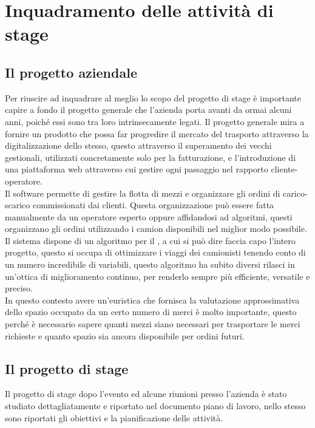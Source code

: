 
\hypertarget{(chap:capitolo3)}{}
\chapter{Inquadramento delle attività di stage}
\section{Il progetto aziendale}
Per riuscire ad inquadrare al meglio lo scopo del progetto di stage è importante capire a fondo il progetto generale che l'azienda porta avanti da ormai alcuni anni, poiché essi sono tra loro intrinsecamente legati. Il progetto generale mira a fornire un prodotto che possa far progredire il mercato del trasporto attraverso la digitalizzazione dello stesso, questo attraverso il superamento dei vecchi gestionali, utilizzati concretamente solo per la fatturazione, e l'introduzione di una piattaforma web attraverso cui gestire ogni passaggio nel rapporto cliente-operatore.\\
Il software permette di gestire la flotta di mezzi e organizzare gli ordini di carico-scarico commissionati dai clienti. Questa organizzazione può essere fatta manualmente da un operatore esperto oppure affidandosi ad algoritmi, questi organizzano gli ordini utilizzando i camion disponibili nel miglior modo possibile.\\
Il sistema dispone di un algoritmo per il , a cui si può dire faccia capo l'intero progetto, questo si occupa di ottimizzare i viaggi dei camionisti tenendo conto di un numero incredibile di variabili, questo algoritmo ha subito diversi rilasci in un'ottica di miglioramento continuo, per renderlo sempre più efficiente, versatile e preciso.\\
In questo contesto avere un'euristica che fornisca la valutazione approssimativa dello spazio occupato da un certo numero di merci è molto importante, questo perché è necessario sapere quanti mezzi siano necessari per trasportare le merci richieste e quanto spazio sia ancora disponibile per ordini futuri.

\section{Il progetto di stage}
Il progetto di stage dopo l'evento  ed alcune riunioni presso l'azienda è stato studiato dettagliatamente e riportato nel documento piano di lavoro, nello stesso sono riportati gli obiettivi e la pianificazione delle attività.

